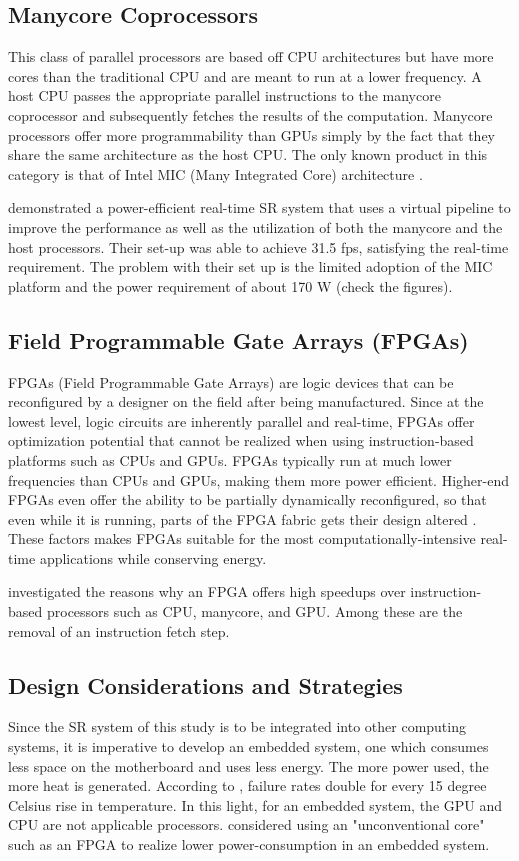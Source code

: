 \subsection{Manycore Coprocessors}
This class of parallel processors are based off CPU architectures but have more cores than the traditional CPU and are meant to run at a lower frequency. 
A host CPU passes the appropriate parallel instructions to the manycore coprocessor and subsequently fetches the results of the computation.
Manycore processors offer more programmability than GPUs simply by the fact that they share the same architecture as the host CPU. 
The only known product in this category is that of Intel MIC (Many Integrated Core) architecture \citep{Intel2014}.

\cite{Ishizaka2013} demonstrated a power-efficient real-time SR system that uses a virtual pipeline to improve the performance as well as the utilization of both the manycore and the host processors. 
Their set-up was able to achieve 31.5 fps, satisfying the real-time requirement.
The problem with their set up is the limited adoption of the MIC platform and the power requirement of about 170 W (check the figures).


\subsection{Field Programmable Gate Arrays (FPGAs)}
FPGAs (Field Programmable Gate Arrays) are logic devices that can be reconfigured by a designer on the field after being manufactured.
Since at the lowest level, logic circuits are inherently parallel and real-time, FPGAs offer optimization potential that cannot be realized when using instruction-based platforms such as CPUs and GPUs. FPGAs typically run at much lower frequencies than CPUs and GPUs, making them more power efficient.
Higher-end FPGAs even offer the ability to be partially dynamically reconfigured, so that even while it is running, parts of the FPGA fabric gets their design altered \citep{Dye2012}.
These factors makes FPGAs suitable for the most computationally-intensive real-time applications while conserving energy.
	
\cite{Sirowy2008} investigated the reasons why an FPGA offers high speedups over instruction-based processors such as CPU, manycore, and GPU. 
Among these are the removal of an instruction fetch step.

\subsection{Design Considerations and Strategies}
Since the SR system of this study is to be integrated into other computing systems, it is imperative to develop an embedded system, one which consumes less space on the motherboard and uses less energy.
The more power used, the more heat is generated. According to \cite{Anderson2003}, failure rates double for every 15 degree Celsius rise in temperature.
In this light, for an embedded system, the GPU and CPU are not applicable processors.
\cite{Mittal2014} considered using an "unconventional core" such as an FPGA to realize lower power-consumption in an embedded system.
\cite{Struyf2014} 




